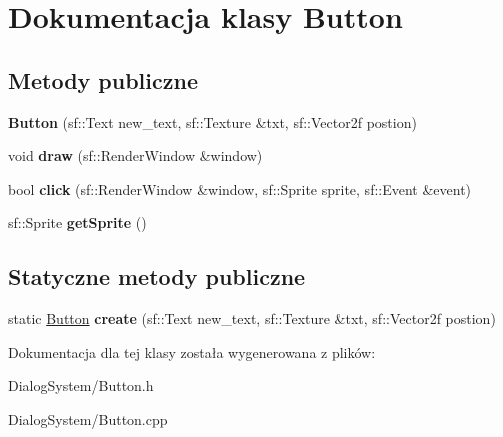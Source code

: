 \hypertarget{class_button}{\section{Dokumentacja klasy Button}
\label{class_button}
}
\subsection*{Metody publiczne}
\begin{DoxyCompactItemize}
\item 
\hypertarget{class_button_af60c30b0db01c76e6940c617364fbb45}{{\bfseries Button} (sf\-::\-Text new\-\_\-text, sf\-::\-Texture \&txt, sf\-::\-Vector2f postion)}\label{class_button_af60c30b0db01c76e6940c617364fbb45}

\item 
\hypertarget{class_button_adf65892636ea303a84e1391106ea7cb0}{void {\bfseries draw} (sf\-::\-Render\-Window \&window)}\label{class_button_adf65892636ea303a84e1391106ea7cb0}

\item 
\hypertarget{class_button_ac66ca457d1227688d738479ff633caab}{bool {\bfseries click} (sf\-::\-Render\-Window \&window, sf\-::\-Sprite sprite, sf\-::\-Event \&event)}\label{class_button_ac66ca457d1227688d738479ff633caab}

\item 
\hypertarget{class_button_a9d9b8af0b3053dd07eef9c3832e5a23c}{sf\-::\-Sprite {\bfseries get\-Sprite} ()}\label{class_button_a9d9b8af0b3053dd07eef9c3832e5a23c}

\end{DoxyCompactItemize}
\subsection*{Statyczne metody publiczne}
\begin{DoxyCompactItemize}
\item 
\hypertarget{class_button_aaeb6570a11ed86b505a31cc250a7c7fb}{static \hyperlink{class_button}{Button} {\bfseries create} (sf\-::\-Text new\-\_\-text, sf\-::\-Texture \&txt, sf\-::\-Vector2f postion)}\label{class_button_aaeb6570a11ed86b505a31cc250a7c7fb}

\end{DoxyCompactItemize}


Dokumentacja dla tej klasy została wygenerowana z plików\-:\begin{DoxyCompactItemize}
\item 
Dialog\-System/Button.\-h\item 
Dialog\-System/Button.\-cpp\end{DoxyCompactItemize}
